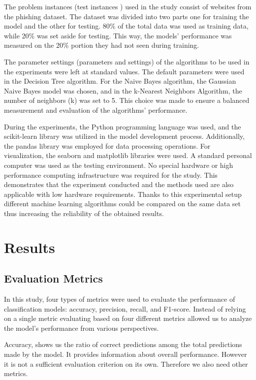 \documentclass[conference]{IEEEtran}
\begin{document}
The problem instances (test instances ) used in the study consist of websites from the phishing dataset. The dataset was divided into two parts one for training the model and the other for testing. 80\% of the total data was used as training data, while 20\% was set aside for testing. This way, the models' performance was measured on the 20\% portion they had not seen during training.

The parameter settings (parameters and settings) of the algorithms to be used in the experiments were left at standard values. The default parameters were used in the Decision Tree algorithm. For the Naive Bayes algorithm, the Gaussian Naive Bayes model was chosen, and in the k-Nearest Neighbors Algorithm, the number of neighbors (k) was set to 5. This choice was made to ensure a balanced measurement and evaluation of the algorithms' performance.

During the experiments, the Python programming language was used, and the scikit-learn library was utilized in the model development process. Additionally, the pandas library was employed for data processing operations. For visualization, the seaborn and matplotlib libraries were used. A standard personal computer was used as the testing environment. No special hardware or high performance computing infrastructure was required for the study. This demonstrates that the experiment conducted and the methods used are also applicable with low hardware requirements. Thanks to this experimental setup different machine learning algorithms could be compared on the same data set thus increasing the reliability of the obtained results.

	\section{Results}
	\label{sec:results}
	
	\subsection{Evaluation Metrics}
In this study, four types of metrics were used to evaluate the performance of classification models: accuracy, precision, recall, and F1-score. Instead of relying on a single metric evaluating based on four different metrics allowed us to analyze the model's performance from various perspectives.

Accuracy, shows us the ratio of correct predictions among the total predictions made by the model. It provides information about overall performance. However it is not a sufficient evaluation criterion on its own. Therefore we also need other metrics.
\end{document}
